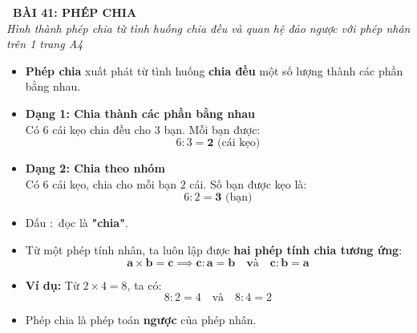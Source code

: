 \documentclass[11pt,a4paper]{article}
\begin{document}
\begin{tcolorbox}[
  enhanced,
  colback=violet!8!white,
  colframe=violet!70!black,
  arc=3mm, boxrule=1.2pt,
  left=3mm, right=3mm, top=2mm, bottom=2mm,
  halign=center
]
  {\LARGE\bfseries\color{violet!90!black}\faBookmark\ BÀI 41: PHÉP CHIA}\\[1mm]
  {\itshape\footnotesize\color{black!75} Hình thành phép chia từ tình huống chia đều và quan hệ đảo ngược với phép nhân trên 1 trang A4}
\end{tcolorbox}

\vspace{-2mm}

\noindent
\begin{minipage}[t]{0.49\textwidth}\vspace{0pt}
\begin{tcolorbox}[
  enhanced,
  colback=violet!4!white,
  colframe=violet!75!black,
  arc=2mm, boxrule=0.8pt,
  left=2mm, right=2mm, top=1.8mm, bottom=1.8mm,
  title={\footnotesize\bfseries\color{white}\faKey\ 1. Khái niệm phép chia}
]
{\footnotesize
\begin{itemize}\setlength{\itemsep}{1pt}\setlength{\leftskip}{-2.5mm}
  \item \textbf{Phép chia} xuất phát từ tình huống \textbf{chia đều} một số lượng thành các phần bằng nhau.
  \item \textbf{Dạng 1: Chia thành các phần bằng nhau}\\
  Có $6$ cái kẹo chia đều cho $3$ bạn. Mỗi bạn được:
  $$6 : 3 = \mathbf{2}\text{ (cái kẹo)}$$
  \item \textbf{Dạng 2: Chia theo nhóm}\\
  Có $6$ cái kẹo, chia cho mỗi bạn $2$ cái. Số bạn được kẹo là:
  $$6 : 2 = \mathbf{3}\text{ (bạn)}$$
  \item Dấu $:$ đọc là \textbf{"chia"}.
\end{itemize}
}
\end{tcolorbox}
\end{minipage}
\hfill
\begin{minipage}[t]{0.49\textwidth}\vspace{0pt}
\begin{tcolorbox}[
  enhanced,
  colback=teal!4!white,
  colframe=teal!75!black,
  arc=2mm, boxrule=0.8pt,
  left=2mm, right=2mm, top=1.8mm, bottom=1.8mm,
  title={\footnotesize\bfseries\color{white}\faSliders\ 2. Quan hệ giữa Phép nhân và Phép chia}
]
{\footnotesize
\begin{itemize}\setlength{\itemsep}{1pt}\setlength{\leftskip}{-2.5mm}
  \item Từ một phép tính nhân, ta luôn lập được \textbf{hai phép tính chia tương ứng}:
  $$\mathbf{a \times b = c \implies c : a = b \quad\text{và}\quad c : b = a}$$
  \item \textbf{Ví dụ:}
  Từ $2 \times 4 = 8$, ta có:
  $$8 : 2 = 4 \quad\text{và}\quad 8 : 4 = 2$$
  \item Phép chia là phép toán \textbf{ngược} của phép nhân.
\end{itemize}
}
\end{tcolorbox}
\end{minipage}
\end{document}
